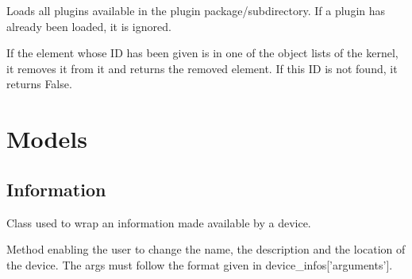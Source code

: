 \documentclass[letterpaper,10pt,english]{sphinxmanual}
\begin{document}
\begin{fulllineitems}
\begin{fulllineitems}
\label{api/kernel:kernel.Kernel.load_plugins}
Loads all plugins available in the plugin package/subdirectory. 
If a plugin has already been loaded, it is ignored.

\end{fulllineitems}


\begin{fulllineitems}
\label{api/kernel:kernel.Kernel.remove_by_id}
If the element whose ID has been given is in one of the
object lists of the kernel, it removes it from it and 
returns the removed element. If this ID is not found, 
it returns False.

\end{fulllineitems}


\end{fulllineitems}



\section{Models}
\label{api/models:models}\label{api/models::doc}

\subsection{Information}
\label{api/models:information}

\begin{fulllineitems}
\label{api/models:models.Information}
Class used to wrap an information made available by a device.

\begin{fulllineitems}
\label{api/models:models.Information.set}
Method enabling the user to change the name, the description and
the location of the device. The args must follow the format given in
device\_infos{[}'arguments'{]}.

\end{fulllineitems}


\end{fulllineitems}
\end{document}
